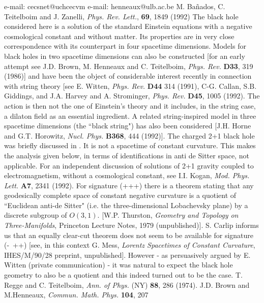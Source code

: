 \documentclass[12pt]{article}
\newcounter{c1} \newcounter{c2}
\begin{document}
\begin{thebibliography}{20}
\bibitem[*]{} e-mail: cecsnet@uchcecvm
\bibitem[\#]{} e-mail: henneaux@ulb.ac.be
M. Ba\~nados, C. Teitelboim and J. Zanelli, {\it Phys. Rev. Lett.},
 {\bf 69}, 1849 (1992)
The black hole considered here is a solution of the standard
Einstein
 equations with a negative cosmological constant and without matter. Its
 properties are in very close correspondence with its counterpart in four
 spacetime dimensions. Models for black holes in two spacetime dimensions can
 also be constructed [for an early attempt see J.D. Brown, M. Henneaux and C.
 Teitelboim, {\it Phys. Rev.} {\bf D33}, 319 (1986)] and have been the
object of
 considerable interest recently in connection with string theory
[see E. Witten,
 {\it Phys. Rev.} {\bf D44} 314 (1991), C-G. Callan, S.B. Giddings, and J.A.
 Harvey and A. Strominger, {\it Phys. Rev.} {\bf D45}, 1005 (1992). The action
 is then not the one of Einstein's theory and it includes, in the string
case, a
 dilaton field as an essential ingredient. A related string-inspired model in
 three spacetime dimensions (the ``black string") has also been considered
[J.H. Horne and G.T. Horowitz, {\it Nucl. Phys.} {\bf B368}, 444 (1992)].
The charged 2+1 black hole was briefly discussed in \cite{1}. It is
not a
 spacetime of constant curvature. This makes the analysis given below, in
terms
 of identifications in anti de Sitter space, not applicable. For an
independent
 discussion of solutions of 2+1 gravity coupled to electromagnetism, without a
 cosmological constant, see I.I. Kogan, {\it Mod. Phys. Lett.} {\bf A7}, 2341
 (1992).
For signature (+++) there is a theorem stating that any
geodesically
 complete space of constant negative curvature is a quotient of ``Euclidean
 anti-de Sitter" (i.e. the three-dimensional Lobachevsky plane) by a discrete
 subgroup of $O (3,1)$. [W.P. Thurston, {\it Geometry and Topology on
 Three-Manifolds}, Princeton Lecture Notes, 1979 (unpublished)]. S. Carlip
 informs us that an equally clear-cut theorem does not seem to be available
for
 signature (-\ ++) [see, in this context G. Mess, {\it Lorentz Spacetimes of
 Constant Curvature}, IHES/M/90/28 preprint, unpublished]. However - as
 persuasively argued by E. Witten (private communication) - it was natural to
 expect the black hole geometry to also be a quotient and this indeed turned
out to be the case.
T. Regge and C. Teitelboim, {\it Ann. of Phys.} (NY) {\bf 88}, 286
 (1974).
J.D. Brown and M.Henneaux, {\it Commun. Math. Phys.} {\bf 104}, 207

\end{thebibliography}
\end{document}
